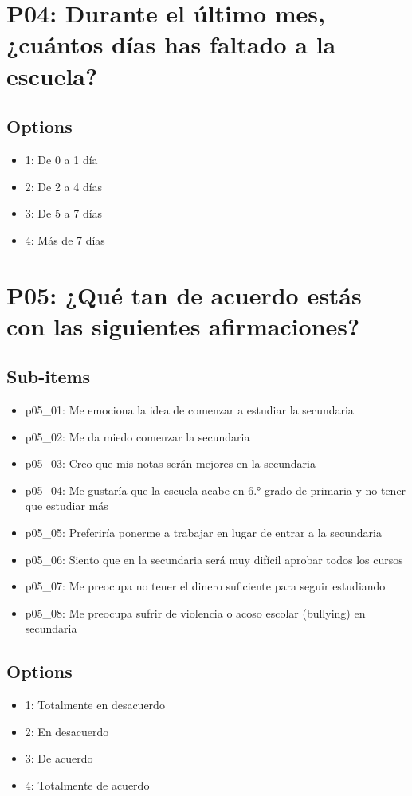 \documentclass[11pt]{article}
\begin{document}
\section*{P04: Durante el último mes, ¿cuántos días has faltado a la escuela?}
\subsection*{Options}
\begin{itemize}[leftmargin=*]
  \item 1: De 0 a 1 día
  \item 2: De 2 a 4 días
  \item 3: De 5 a 7 días
  \item 4: Más de 7 días
\end{itemize}
\bigskip
\section*{P05: ¿Qué tan de acuerdo estás con las siguientes afirmaciones?}
\subsection*{Sub-items}
\begin{itemize}[leftmargin=*]
  \item p05\_01: Me emociona la idea de comenzar a estudiar la secundaria
  \item p05\_02: Me da miedo comenzar la secundaria
  \item p05\_03: Creo que mis notas serán mejores en la secundaria
  \item p05\_04: Me gustaría que la escuela acabe en 6.° grado de primaria y no tener que estudiar más
  \item p05\_05: Preferiría ponerme a trabajar en lugar de entrar a la secundaria
  \item p05\_06: Siento que en la secundaria será muy difícil aprobar todos los cursos
  \item p05\_07: Me preocupa no tener el dinero suficiente para seguir estudiando
  \item p05\_08: Me preocupa sufrir de violencia o acoso escolar (bullying) en secundaria
\end{itemize}
\subsection*{Options}
\begin{itemize}[leftmargin=*]
  \item 1: Totalmente en desacuerdo
  \item 2: En desacuerdo
  \item 3: De acuerdo
  \item 4: Totalmente de acuerdo
\end{itemize}
\bigskip
\end{document}
